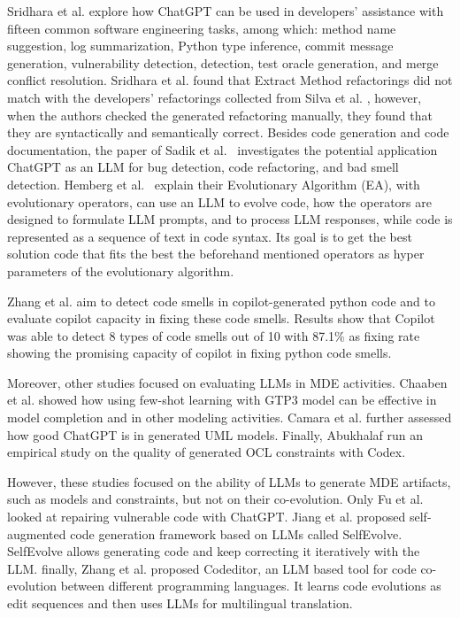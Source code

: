 Sridhara et al. \cite{sridhara2023chatgpt} explore how ChatGPT can be used in developers' assistance with fifteen common software engineering tasks, among which: method name suggestion, log summarization, Python type inference, commit message generation, vulnerability detection, detection, test oracle generation, and merge conflict resolution. Sridhara et al. \cite{sridhara2023chatgpt} found that Extract Method refactorings did not match with the developers' refactorings collected from Silva et al. \cite{10.1145/2950290.2950305}, however, when the authors checked the generated refactoring manually, they found that they are syntactically and semantically correct.
Besides code generation and code documentation, the paper of Sadik et al.~\cite{sadik2023analysis} investigates the potential application ChatGPT as an LLM for bug detection, code refactoring, and bad smell detection.
  Hemberg et al.~\cite{hemberg2024evolving} explain their Evolutionary Algorithm (EA), with evolutionary operators, can use an LLM to evolve code, how the operators are designed to formulate LLM prompts, and to process LLM responses, while code is represented as a sequence of text in code syntax. Its goal is to get the best solution code that fits the best the beforehand mentioned operators as hyper parameters of the evolutionary algorithm.
  
   Zhang et al.\cite{zhang2024copilot} aim to detect code smells in  copilot-generated python code and to evaluate copilot capacity in fixing these code smells. Results show that Copilot was able to detect 8 types of code smells out of 10 with 87.1\% as fixing rate showing the promising capacity of copilot in fixing python code smells.
  
 Moreover, other studies focused on evaluating LLMs in MDE activities. 
 Chaaben et al. \cite{chaaben2023towards} showed how using few-shot learning with GTP3 model can be effective in model completion and in other modeling activities. 
 Camara et al. \cite{camara2023assessment} further assessed how good ChatGPT is in generated UML models.
 Finally, Abukhalaf \cite{AbukhalafHK23} run an empirical study on the quality of generated OCL constraints with Codex.
 
 However, these studies focused on the ability of LLMs to generate MDE artifacts, such as models and constraints, but not on their co-evolution. 
 Only Fu et al. \cite{fu2023chatgpt} looked at repairing vulnerable code with ChatGPT. 
 Jiang et al. \cite{jiang2023selfevolve} proposed self-augmented code generation framework based on LLMs called SelfEvolve. SelfEvolve allows generating code and keep correcting it iteratively with the LLM. %
 finally, Zhang et al. \cite{zhang2023multilingual} proposed Codeditor, an LLM based tool for code co-evolution between different programming languages. It learns code evolutions as edit sequences and then uses LLMs for multilingual translation.
  
